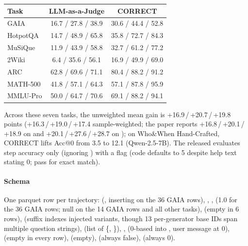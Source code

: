 \begin{center}\small
\begin{tabular}{@{}lcc@{}}\toprule
Task & LLM-as-a-Judge & CORRECT\\\midrule
GAIA & 16.7 / 27.8 / 38.9 & 30.6 / 44.4 / 52.8\\
HotpotQA & 14.7 / 48.9 / 65.8 & 35.8 / 72.7 / 84.3\\
MuSiQue & 11.9 / 43.9 / 58.8 & 32.7 / 61.2 / 77.2\\
2Wiki & 6.4 / 35.6 / 56.1 & 16.9 / 49.9 / 69.0\\
ARC & 62.8 / 69.6 / 71.1 & 80.4 / 88.2 / 91.2\\
MATH-500 & 41.8 / 57.1 / 64.3 & 57.1 / 87.8 / 95.9\\
MMLU-Pro & 50.0 / 64.7 / 70.6 & 69.1 / 88.2 / 94.1\\\bottomrule
\end{tabular}
\end{center}
Across these seven  tasks, the unweighted mean gain is +16.9\,/\,+20.7\,/\,+19.8 points (+16.3\,/\,+19.0\,/\,+17.4 sample-weighted; the paper reports +16.8\,/\,+20.1\,/\,+18.9 on  and +20.1\,/\,+27.6\,/\,+28.7 on ); on Who\&When Hand-Crafted, CORRECT lifts Acc@0 from 3.5 to 12.1 (Qwen-2.5-7B). The released  evaluates step accuracy only (ignoring ) with a  flag (code defaults to 5 despite help text stating 0; pass  for exact match).

\paragraph{Schema} One parquet row per trajectory:  (, inserting  on the 36 GAIA  rows), , ,  (1.0 for the 36 GAIA  rows; null on the 14  GAIA rows and all other tasks),  (empty in 6 rows),  (suffix  indexes injected variants, though 13 per-generator base IDs span multiple question strings),  (list of \{, \}), ,  (0-based into , user message at 0),  (empty in every row),  (empty),  (always false),  (always 0).

